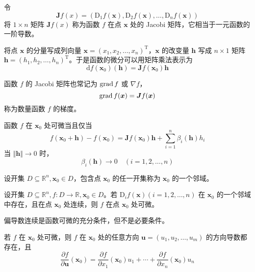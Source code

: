 \begin{definition}
    令
    \[
        \bm{J}f(x) = (\mathrm{D}_{1}f(\bm{x}), \mathrm{D}_{2}f(\bm{x}), \ldots, \mathrm{D}_{n}f(\bm{x}))
    \]
    将 $1 \times n$ 矩阵 $\bm{J}f(x)$ 称为函数 $f$ 在点 $\bm{x}$ 处的 Jacobi 矩阵，它相当于一元函数的一阶导数。
\end{definition}

\begin{remark}
    将点 $\bm{x}$ 的分量写成列向量 $\bm{x} = (x_1, x_2, \ldots, x_n)^{\mathrm{T}}$，$\bm{x}$ 的改变量 $\bm{h}$ 写成 $n \times 1$ 矩阵 $\bm{h} = (h_1, h_2, \ldots, h_n)^{\mathrm{T}}$。于是函数的微分可以用矩阵乘法表示为
    \[
        \mathrm{d}f(\bm{x}_0)(\bm{h}) = \bm{J}f(\bm{x}_0)\bm{h}
    \]
\end{remark}

\begin{remark}
    函数 $f$ 的 Jacobi 矩阵也常记为 $\operatorname{grad} f$ 或 $\nabla f$，
    \[
        \operatorname{grad} f(\bm{x}) = \bm{J}f(\bm{x})
    \]
    称为数量函数 $f$ 的梯度。
\end{remark}

\begin{theorem}
    函数 $f$ 在 $\bm{x}_0$ 处可微当且仅当
    \[
        f(\bm{x}_0 + \bm{h}) - f(\bm{x}_0) = \bm{J}f(\bm{x}_0)\bm{h} + \sum_{i = 1}^{n}\beta_{i}(\bm{h})h_{i}
    \]
    当 $\Vert \bm{h} \Vert \to 0$ 时，
    \[
        \beta_{i}(\bm{h}) \to 0 \quad (i = 1, 2, \ldots, n)
    \]
\end{theorem}

\begin{definition}
  设开集 $D \subseteq \mathbb{R}^n, \bm{x}_0 \in D$，包含点 $\bm{x}_0$ 的任一开集称为 $\bm{x}_0$ 的一个邻域。
\end{definition}

\begin{theorem}
  设开集 $D \subseteq \mathbb{R}^n, f: D \to \mathbb{R}, \bm{x}_0 \in D$。若 $\mathrm{D}_{i}f(\bm{x})(i = 1, 2, \ldots, n)$ 在 $\bm{x}_0$ 的一个邻域中存在，且在点 $\bm{x}_0$ 处连续，则 $f$ 在点 $\bm{x}_0$ 处可微。
\end{theorem}

\begin{remark}
  偏导数连续是函数可微的充分条件，但不是必要条件。
\end{remark}

\begin{theorem}
  若 $f$ 在 $\bm{x}_0$ 处可微，则 $f$ 在 $\bm{x}_0$ 处的任意方向 $\bm{u} = (u_1, u_2, \ldots, u_m)$ 的方向导数都存在，且
  \[
      \frac{\partial f}{\partial \bm{u}}(\bm{x}_0) = \frac{\partial f}{\partial x_1}(\bm{x}_0)u_{1} + \cdots + \frac{\partial f}{\partial x_n}(\bm{x}_0)u_{n}
  \]
\end{theorem}

